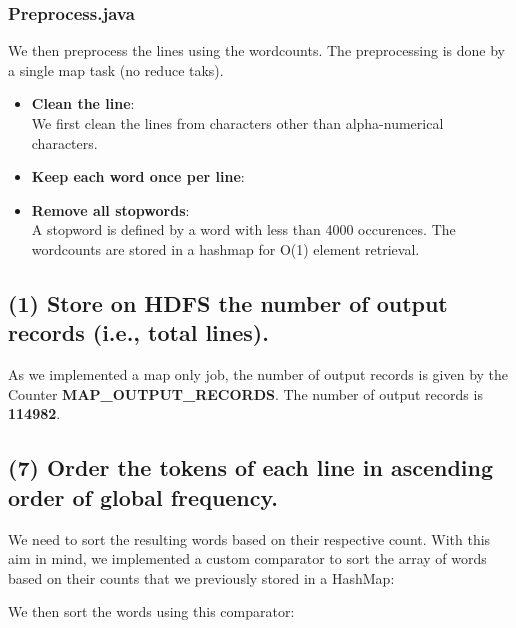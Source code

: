 \documentclass[a4paper,10pt]{article}
\begin{document}
\subsubsection{Preprocess.java}
We then preprocess the lines using the wordcounts.
The preprocessing is done by a single map task (no reduce taks).

\begin{itemize}
  \item \textbf{Clean the line}:\\
  We first clean the lines from characters other than alpha-numerical characters.
  

  \item \textbf{Keep each word once per line}:\\
  

  \item \textbf{Remove all stopwords}:\\
  A stopword is defined by a word with less than 4000 occurences.
  The wordcounts are stored in a hashmap for O(1) element retrieval.
  
\end{itemize}

\subsection{(1) Store on HDFS the number of output records (i.e., total lines).}
As we implemented a map only job, the number of output records is given by the Counter
\textbf{MAP\_OUTPUT\_RECORDS}. The number of output records is \textbf{114982}.


\subsection{(7) Order the tokens of each line in ascending order of global frequency.}
We need to sort the resulting words based on their respective count.
With this aim in mind, we implemented a custom comparator to sort the array of words
based on their counts that we previously stored in a HashMap:

We then sort the words using this comparator:

\end{document}
